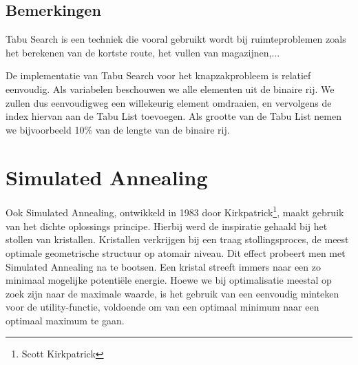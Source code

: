 \subsection{Bemerkingen} Tabu Search is een techniek die vooral gebruikt wordt bij ruimteproblemen zoals het berekenen van de kortste route, het vullen van magazijnen,...
\begin{leftbar}
De implementatie van Tabu Search voor het knapzakprobleem is relatief eenvoudig. Als variabelen beschouwen we alle elementen uit de binaire rij. We zullen dus eenvoudigweg een willekeurig element omdraaien, en vervolgens de index hiervan aan de Tabu List toevoegen. Als grootte van de Tabu List nemen we bijvoorbeeld 10\% van de lengte van de binaire rij.
\end{leftbar}
\section{Simulated Annealing}
\label{ss:simulatedAnnealing}
Ook Simulated Annealing, ontwikkeld in 1983 door Kirkpatrick\footnote{Scott Kirkpatrick}, maakt gebruik van het dichte oplossings principe. Hierbij werd de inspiratie gehaald bij het stollen van kristallen. Kristallen verkrijgen bij een traag stollingsproces, de meest optimale geometrische structuur op atomair niveau. Dit effect probeert men met Simulated Annealing na te bootsen. Een kristal streeft immers naar een zo minimaal mogelijke potenti\"ele energie. Hoewe we bij optimalisatie meestal op zoek zijn naar de maximale waarde, is het gebruik van een eenvoudig minteken voor de utility-functie, voldoende om van een optimaal minimum naar een optimaal maximum te gaan.
